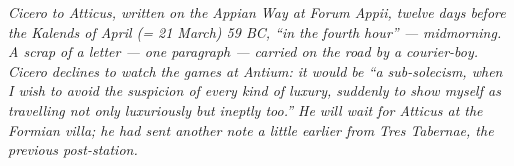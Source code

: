 
\textit{Cicero to Atticus, written on the Appian Way at
Forum Appii, twelve days before the Kalends of April (=
21 March) 59 BC, ``in the fourth hour'' --- midmorning.
A scrap of a letter --- one paragraph --- carried on the
road by a courier-boy. Cicero declines to watch the games
at Antium: it would be ``a sub-solecism, when I wish to
avoid the suspicion of every kind of luxury, suddenly to
show myself as travelling not only luxuriously but
ineptly too.'' He will wait for Atticus at the Formian
villa; he had sent another note a little earlier from
Tres Tabernae, the previous post-station.}
